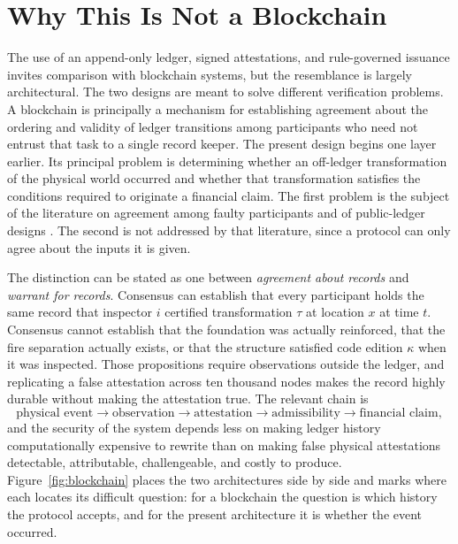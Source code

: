 \documentclass[11pt]{article}
\theoremstyle{definition}
\begin{document}
\section{Why This Is Not a Blockchain}
\label{sec:blockchain}

The use of an append-only ledger, signed attestations, and rule-governed issuance invites comparison with blockchain systems, but the resemblance is largely architectural. The two designs are meant to solve different verification problems. A blockchain is principally a mechanism for establishing agreement about the ordering and validity of ledger transitions among participants who need not entrust that task to a single record keeper. The present design begins one layer earlier. Its principal problem is determining whether an off-ledger transformation of the physical world occurred and whether that transformation satisfies the conditions required to originate a financial claim. The first problem is the subject of the literature on agreement among faulty participants \cite{lamport1982, castro1999} and of public-ledger designs \cite{nakamoto2008}. The second is not addressed by that literature, since a protocol can only agree about the inputs it is given.

The distinction can be stated as one between \emph{agreement about records} and \emph{warrant for records}. Consensus can establish that every participant holds the same record that inspector $i$ certified transformation $\tau$ at location $x$ at time $t$. Consensus cannot establish that the foundation was actually reinforced, that the fire separation actually exists, or that the structure satisfied code edition $\kappa$ when it was inspected. Those propositions require observations outside the ledger, and replicating a false attestation across ten thousand nodes makes the record highly durable without making the attestation true. The relevant chain is
\begin{equation}
\text{physical event}\longrightarrow\text{observation}\longrightarrow\text{attestation}\longrightarrow\text{admissibility}\longrightarrow\text{financial claim},
\label{eq:warrantchain}
\end{equation}
and the security of the system depends less on making ledger history computationally expensive to rewrite than on making false physical attestations detectable, attributable, challengeable, and costly to produce. Figure~\ref{fig:blockchain} places the two architectures side by side and marks where each locates its difficult question: for a blockchain the question is which history the protocol accepts, and for the present architecture it is whether the event occurred.
\end{document}
